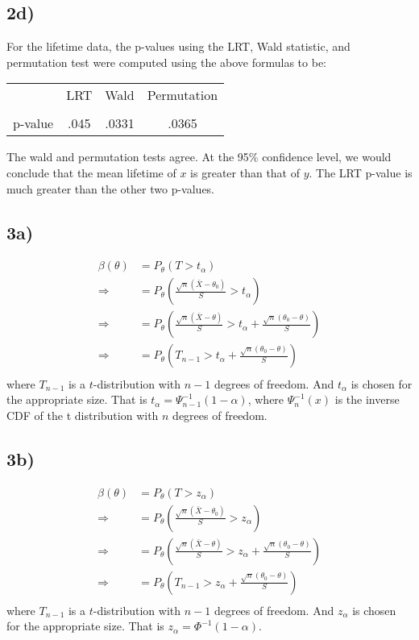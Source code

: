\documentclass[11pt]{article}
\def\hline{ \textcolor{lgrey}{\hrulefill} }
\begin{document}
\subsection*{2d)}
For the lifetime data, the p-values using the LRT, Wald statistic, and
permutation test were computed using the above formulas to be:

\begin{center}
\begin{tabular}{c|ccc}
  & LRT & Wald & Permutation \\
  \hline & \hline & \hline & \hline \\
  p-value  & .045 & .0331 &.0365
\end{tabular}
\end{center}

\noindent
The wald and permutation tests agree. At the 95\% confidence level, we would 
conclude that the mean lifetime of $x$ is greater than that of $y$. 
The LRT p-value is much greater than the other two p-values. 

\subsection*{3a)}
\[
\begin{aligned}
  \beta(\theta) &= P_\theta(T>t_\alpha) \\
  \Rightarrow &= P_\theta(\frac{\sqrt{n} (\bar X - \theta_0) }{S} > t_\alpha) \\
  \Rightarrow &= P_\theta(\frac{\sqrt{n} (\bar X - \theta) }{S} > t_\alpha + \frac{\sqrt{n} (\theta_0-\theta)}{S}) \\
  \Rightarrow &= P_\theta(T_{n-1} > t_\alpha + \frac{\sqrt{n} (\theta_0-\theta)}{S}) \\
\end{aligned}
\]
where $T_{n-1}$ is a $t$-distribution with $n-1$ degrees of freedom. And
$t_\alpha$ is chosen for the appropriate size.  That is $t_\alpha =
\Psi_{n-1}^{-1}(1-\alpha)$, where $\Psi_{n}^{-1}(x)$ is the inverse CDF of the
t distribution with $n$ degrees of freedom.


\subsection*{3b)}
\[
\begin{aligned}
  \beta(\theta) &= P_\theta(T>z_\alpha) \\
  \Rightarrow &= P_\theta(\frac{\sqrt{n} (\bar X - \theta_0) }{S} > z_\alpha) \\
  \Rightarrow &= P_\theta(\frac{\sqrt{n} (\bar X - \theta) }{S} > z_\alpha + \frac{\sqrt{n} (\theta_0-\theta)}{S}) \\
  \Rightarrow &= P_\theta(T_{n-1} > z_\alpha + \frac{\sqrt{n} (\theta_0-\theta)}{S}) \\
\end{aligned}
\]
where $T_{n-1}$ is a $t$-distribution with $n-1$ degrees of freedom. And $z_\alpha$ is chosen for the appropriate size.
That is $z_\alpha = \Phi^{-1}(1-\alpha)$.
\end{document}
